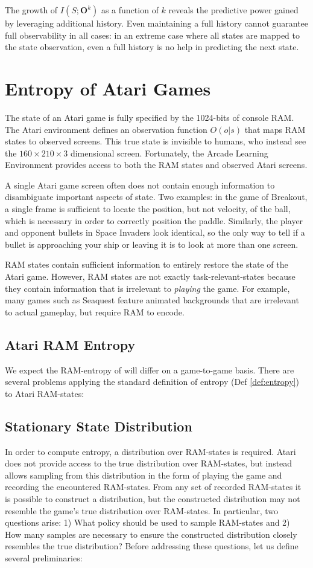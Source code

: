 \documentclass{article} %
\theoremstyle{definition}
\begin{document}
The growth of $I(S;\textbf{O}^k)$ as a function of $k$ reveals the
predictive power gained by leveraging additional history. Even
maintaining a full history cannot guarantee full observability in all
cases: in an extreme case where all states are mapped to the state
observation, even a full history is no help in predicting the next
state.

\section{Entropy of Atari Games}
The state of an Atari game is fully specified by the 1024-bits of
console RAM. The Atari environment defines an observation function
$O(o|s)$ that maps RAM states to observed screens. This true state is
invisible to humans, who instead see the $160 \times 210 \times 3$
dimensional screen. Fortunately, the Arcade Learning Environment
provides access to both the RAM states and observed Atari screens.

A single Atari game screen often does not contain enough information
to disambiguate important aspects of state. Two examples: in the game
of Breakout, a single frame is sufficient to locate the position, but
not velocity, of the ball, which is necessary in order to correctly
position the paddle. Similarly, the player and opponent bullets in
Space Invaders look identical, so the only way to tell if a bullet is
approaching your ship or leaving it is to look at more than one
screen.

RAM states contain sufficient information to entirely restore the
state of the Atari game. However, RAM states are not exactly
task-relevant-states because they contain information that is
irrelevant to \textit{playing} the game. For example, many games such
as Seaquest feature animated backgrounds that are irrelevant to actual
gameplay, but require RAM to encode.

\subsection{Atari RAM Entropy}
We expect the RAM-entropy of will differ on a game-to-game
basis. There are several problems applying the standard definition of
entropy (Def \ref{def:entropy}) to Atari RAM-states:

\subsection{Stationary State Distribution}
In order to compute entropy, a distribution over RAM-states is
required. Atari does not provide access to the true distribution over
RAM-states, but instead allows sampling from this distribution in the
form of playing the game and recording the encountered
RAM-states. From any set of recorded RAM-states it is possible to
construct a distribution, but the constructed distribution may not
resemble the game's true distribution over RAM-states. In particular,
two questions arise: 1) What policy should be used to sample
RAM-states and 2) How many samples are necessary to ensure the
constructed distribution closely resembles the true distribution?
Before addressing these questions, let us define several
preliminaries:
\end{document}
